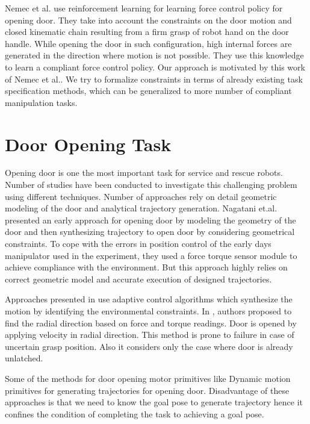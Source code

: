 \documentclass[thesis]{mas_proposal}
\begin{document}
Nemec et al. use reinforcement learning for learning force control policy for opening door\cite{nemec2017door}. They take into account the constraints on the door motion and closed kinematic chain resulting from a firm grasp of robot hand on the door handle. While opening the door in such configuration, high internal forces are generated in the direction where motion is not possible. They use this knowledge to learn a compliant force control policy. Our approach is motivated by this work of Nemec et al.\cite{nemec2017door}. We try to formalize constraints in terms of already existing task specification methods, which can be generalized to more number of compliant manipulation tasks. 

\section{Door Opening Task}

Opening door is one the most important task for service and rescue robots. Number of studies have been conducted to investigate this challenging problem using different techniques. Number of approaches rely on detail geometric modeling of the door and analytical trajectory generation. Nagatani et.al. \cite{nagatani1995experiment} presented an early approach for opening door by modeling the geometry of the door and then synthesizing trajectory to open door by considering geometrical constraints. To cope with the errors in position control of the early days manipulator used in the experiment, they used a force torque sensor module to achieve compliance with the environment. But this approach highly relies on correct geometric model and accurate execution of designed trajectories.

Approaches presented in \cite{levihn2014using,karayiannidis2012adaptive,niemeyer1997simple} use adaptive control algorithms which synthesize the motion by identifying the environmental constraints. In \cite{karayiannidis2012adaptive}, authors proposed to find the radial direction based on force and torque readings. Door is opened by applying velocity in radial direction. This method is prone to failure in case of uncertain grasp position. Also it considers only the case where door is already unlatched. 

Some of the methods for door opening motor primitives like Dynamic motion primitives for generating trajectories for opening door. Disadvantage of these approaches is that we need to know the goal pose to generate trajectory hence it confines the condition of completing the task to achieving a goal pose. 
\end{document}
